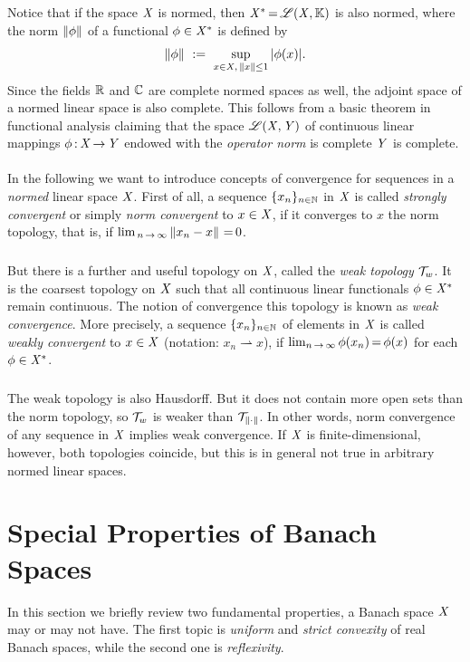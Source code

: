 \documentclass[11pt,twoside]{article}
\begin{document}
\subparagraph*{}
Notice that if the space $\mathit{X}$ is normed,
then $\mathit{X}^* {\,=\,} \mathscr{L}(\mathit{X},{\mathbb{K}})$ is also normed,
where the norm $\left\lVert \phi \right\rVert$ of a functional $\phi \in \mathit{X}^*$ is defined by
\[
\norm{\phi} \, \eqdef \, \sup_{x \in \banX,\,\norm{x} \leq 1} \, \abs{\phi(x)} .
\]
Since the fields ${\mathbb{R}}$ and ${\mathbb{C}}$ are complete normed spaces as well,
the {adjoint space} of a normed linear space is also complete.
This follows from  a basic theorem in functional analysis claiming
that the space $\mathscr{L}(\mathit{X},\mathit{Y})$ of continuous linear mappings
$\phi{\,:\,}\mathit{X} {\,\to\,} \mathit{Y}$ endowed with the \textit{operator norm}
is complete \iff $\mathit{Y}$ is complete.

\paragraph*{} %
In the following we want to introduce concepts of convergence
for sequences in a \textit{normed} linear space $\mathit{X}$.
First of all,
a sequence $\{x_n\}_{n \in {\mathbb{N}}}$ in $\mathit{X}$
is called \textit{strongly convergent}
or simply \textit{norm convergent} to $x \in \mathit{X}$,
if it converges to $x$ {\wrt} the norm topology,
that is,
if $\lim_{\,n {\,\to\,} \infty} \left\lVert x_n-x \right\rVert {\,=\,} 0$.

\subparagraph*{} %
But there is a further and useful topology on $\mathit{X}$,
called the \textit{weak topology} $\mathcal{T}_w$.
It is the coarsest topology on $\mathit{X}$
such that all continuous linear functionals
$\phi \in \mathit{X}^*$ remain continuous.
The notion of convergence {\wrt} this topology
is known as \textit{weak convergence}.
More precisely,
a sequence $\{x_n\}_{n \in {\mathbb{N}}}$ of elements in $\mathit{X}$
is called \textit{weakly convergent} to $x \in \mathit{X}$
(notation: $x_n \rightharpoonup x$),
if $\lim_{n {\,\to\,} \infty} \phi(x_n) {\,=\,} \phi(x)$ for each $\phi \in \mathit{X}^*$.

\subparagraph*{} %
The weak topology is also Hausdorff.
But it does not contain more open sets than the norm topology,
so $\mathcal{T}_w$ is weaker than $\mathcal{T}_{\left\lVert \cdot \right\rVert}$.
In other words,
norm convergence of any sequence in $\mathit{X}$ implies weak convergence.
If $\mathit{X}$ is finite-dimensional,
however,
both topologies coincide,
but this is in general not true in arbitrary normed linear spaces.

\section{Special Properties of Banach Spaces}                                  %
In this section we briefly review two fundamental properties,
a Banach space $\mathit{X}$ may or may not have.
The first topic is \textit{uniform} and \textit{strict convexity}
of real Banach spaces,
while the second one is \textit{reflexivity}.
\end{document}
